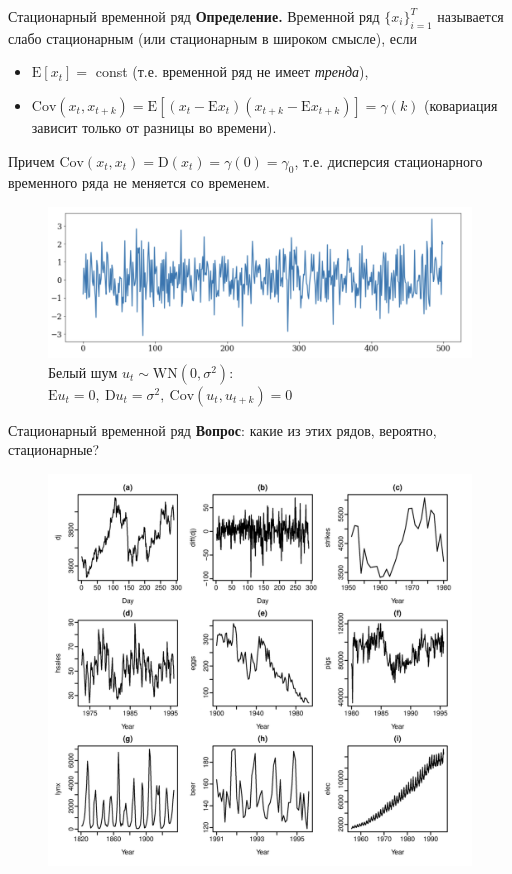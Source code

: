 \begin{frame}{Стационарный временной ряд}
\textbf{Определение.} Временной ряд $\{x_i\}_{i=1}^{T}$ называется слабо стационарным (или стационарным в широком смысле), если
\begin{itemize}
    \item $\mathrm{E}[x_t]=$ const (т.е. временной ряд не имеет \textit{тренда}),
    \item $\mathrm{Cov}(x_t,x_{t+k}) = \mathrm{E}[(x_t - \mathrm{E}x_t)(x_{t+k} - \mathrm{E}x_{t+k})] = \gamma(k)$ (ковариация зависит только от разницы во времени).
\end{itemize}
Причем $\mathrm{Cov}(x_t,x_{t}) = \mathrm{D}(x_t) = \gamma(0) = \gamma_0$, т.е. дисперсия стационарного временного ряда не меняется со временем.
\begin{figure}
    \centering
    \includegraphics[width=0.9\linewidth]{lecture_2/fig/noise.png}
    \caption{Белый шум $u_t \sim \text{WN}(0, \sigma^2)$: $\mathrm{E}u_t = 0, \ \mathrm{D}u_t = \sigma^2, \ \mathrm{Cov}(u_t, u_{t + k}) = 0$}
\end{figure}
\end{frame}
\begin{frame}{Стационарный временной ряд}
\textbf{Вопрос}: какие из этих рядов, вероятно, стационарные?
\begin{figure}
    \centering
    \includegraphics[width=0.8\linewidth]{lecture_2/fig/ts_stationary.png}
\end{figure}
\end{frame}
